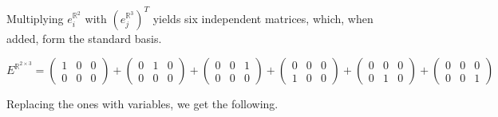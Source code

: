 \documentclass[a4paper]{article}
\begin{document}
\begin{Example}
\begin{PropositionOpt4}
Multiplying $e_{i}^{\mathbb{R}^{2}}$ with $(e_{j}^{\mathbb{R}^{3}})^{T}$ yields six independent matrices, which, when added, form the standard basis.

\begin{displaymath}
E^{\mathbb{R}^{2\times{3}}} =
\begin{pmatrix}1&0&0\\0&0&0\end{pmatrix}+
\begin{pmatrix}0&1&0\\0&0&0\end{pmatrix}+
\begin{pmatrix}0&0&1\\0&0&0\end{pmatrix}+
\begin{pmatrix}0&0&0\\1&0&0\end{pmatrix}+
\begin{pmatrix}0&0&0\\0&1&0\end{pmatrix}+
\begin{pmatrix}0&0&0\\0&0&1\end{pmatrix}

\end{displaymath}

Replacing the ones with variables, we get the following.


\end{PropositionOpt4}
\end{Example}
\end{document}

